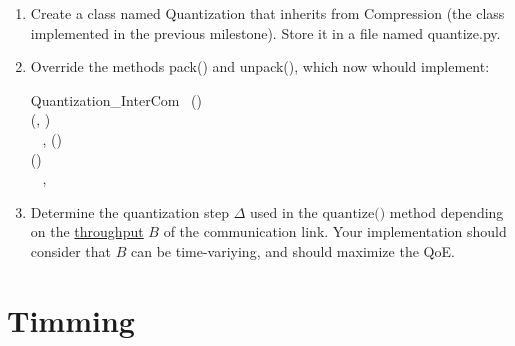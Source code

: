 \begin{enumerate}
\item Create a class named Quantization that inherits from
  Compression (the class implemented in the previous
  milestone). Store it in a file named quantize.py.
  
\item Override the methods pack() and unpack(),
  which now whould implement:

\begin{pseudocode}{Quantization\_InterCom}{~}
  \BEGIN
     \GETS {}()\\
     \GETS {}(, )\\
    ~ 
  \END
  \ENDPROCEDURE
  \BEGIN
    ,  \GETS {}()\\
     \GETS {}()\\
    ~ , 
  \END
  \ENDPROCEDURE
\end{pseudocode}

\item Determine the quantization step $\Delta$ used in the
  $\text{quantize()}$ method depending on
  the \href{https://en.wikipedia.org/wiki/Throughput}{throughput} $B$
  of the communication link. Your implementation should consider that
  $B$ can be time-variying, and should maximize the QoE.

\end{enumerate}

\section{Timming}

